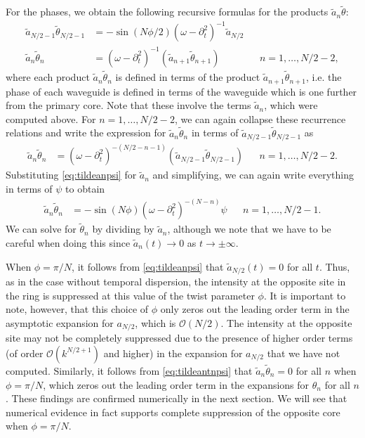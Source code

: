 \documentclass[11pt,reqno]{amsart}
\begin{document}
For the phases, we obtain the following recursive formulas for the products $\widetilde{a}_n\widetilde{\theta}$:
\begin{equation}\label{eq:tildeantn}
\begin{aligned}
\widetilde{a}_{N/2-1}\widetilde{\theta}_{N/2-1} &= -\sin(N \phi/2) (\omega - \partial_t^2)^{-1} \widetilde{a}_{N/2} \\
\widetilde{a}_n \widetilde{\theta}_n &= (\omega - \partial_t^2)^{-1} \left( \widetilde{a}_{n+1} \widetilde{\theta}_{n+1} \right) && n = 1, \dots, N/2-2,
\end{aligned}
\end{equation}
where each product $\widetilde{a}_n \widetilde{\theta}_n$ is defined in terms of the product $\widetilde{a}_{n+1} \widetilde{\theta}_{n+1}$, i.e. the phase of each waveguide is defined in terms of the waveguide which is one further from the primary core.
Note that these involve the terms $\widetilde{a}_n$, which were computed above. For $n = 1, \dots, N/2-2$, we can again collapse these recurrence relations and write the expression for $\widetilde{a}_n \widetilde{\theta}_n$ in terms of $\widetilde{a}_{N/2-1} \widetilde{\theta}_{N/2-1}$ as
\begin{align*}
\widetilde{a}_n \widetilde{\theta}_n &= (\omega - \partial_t^2)^{-(N/2-n-1)} \left( \widetilde{a}_{N/2-1} \widetilde{\theta}_{N/2-1} \right) && n = 1, \dots, N/2-2.
\end{align*}
Substituting \cref{eq:tildeanpsi} for $\widetilde{a}_n$ and simplifying, we can again write everything in terms of $\psi$ to obtain
\begin{equation}\label{eq:tildeantnpsi}
\begin{aligned}
\widetilde{a}_n \widetilde{\theta}_n &= -\sin(N \phi) (\omega - \partial_t^2)^{-(N-n)} \psi && n = 1, \dots, N/2-1.
\end{aligned}
\end{equation}
We can solve for $\widetilde{\theta}_n$ by dividing by $\widetilde{a}_n$, although we note that we have to be careful when doing this since $\widetilde{a}_n(t) \rightarrow 0$ as $t \rightarrow \pm \infty$.

When $\phi = \pi/N$, it follows from \cref{eq:tildeanpsi} that $\widetilde{a}_{N/2}(t) = 0$ for all $t$. Thus, as in the case without temporal dispersion, the intensity at the opposite site in the ring is suppressed at this value of the twist parameter $\phi$. It is important to note, however, that this choice of $\phi$ only zeros out the leading order term in the asymptotic expansion for $a_{N/2}$, which is $\mathcal{O}(N/2)$. The intensity at the opposite site may not be completely suppressed due to the presence of higher order terms (of order $\mathcal{O}(k^{N/2+1})$ and higher) in the expansion for $a_{N/2}$ that we have not computed. Similarly, it follows from \cref{eq:tildeantnpsi} that $\widetilde{a}_n \widetilde{\theta}_n = 0$ for all $n$ when $\phi = \pi/N$, which zeros out the leading order term in the expansions for $\theta_n$ for all $n$. These findings are confirmed numerically in the next section. We will see that numerical evidence in fact supports complete suppression of the opposite core when $\phi = \pi/N$.
\end{document}

